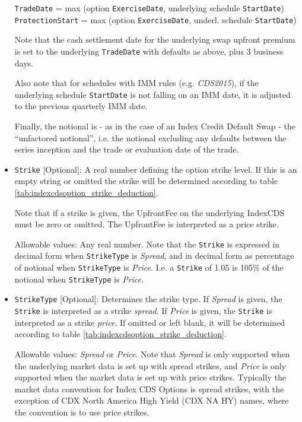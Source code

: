 \begin{itemize}
 \lstinline!TradeDate! = max (option \lstinline!ExerciseDate!, underlying schedule \lstinline!StartDate!) \\
 \lstinline!ProtectionStart! = max (option \lstinline!ExerciseDate!, underl. schedule \lstinline!StartDate!)

Note that the  cash settlement date for the underlying swap upfront premium is set to the underlying \lstinline!TradeDate! with defaults as above, plus 3 business days. 

Also note that for schedules with IMM rules (e.g. \emph{CDS2015}), if the underlying schedule \lstinline!StartDate! is not falling on an IMM date, it is adjusted to the previous quarterly IMM date.

Finally, the notional is - as in the case of an Index Credit Default Swap - the ``unfactored notional'', i.e. the notional excluding any defaults between the series inception and the trade or evaluation date of the trade.

\item
\lstinline!Strike! [Optional]: A real number defining the option strike level. If this is an empty string or omitted the strike will be determined according to table \ref{tab:indexcdsoption_strike_deduction}. 

Note that if a strike is given, the UpfrontFee on the underlying IndexCDS must be zero or omitted. The UpfrontFee is interpreted as a price strike.

Allowable values: Any real number. Note that the \lstinline!Strike! is expressed in decimal form when \lstinline!StrikeType! is \emph{Spread}, and  in decimal form as percentage of notional when \lstinline!StrikeType! is \emph{Price}. I.e. a  \lstinline!Strike! of 1.05 is 105\% of the notional when \lstinline!StrikeType! is \emph{Price}.

\item
\lstinline!StrikeType! [Optional]: Determines the strike type. If \emph{Spread} is given, the \lstinline!Strike! is interpreted as a strike \emph{spread}. If \emph{Price} is given, the \lstinline!Strike! is interpreted as a strike \emph{price}. If omitted or left blank, it will be determined according to table \ref{tab:indexcdsoption_strike_deduction}. 

Allowable values: \emph{Spread} or \emph{Price}. Note that \emph{Spread} is only supported when the underlying market data is set up with spread strikes, and \emph{Price} is only supported when the market data is set up with price strikes. Typically the market data convention for Index CDS Options is spread strikes, with the exception of CDX North America High Yield (CDX NA HY) names, where the convention is to use price strikes.


\end{itemize}
